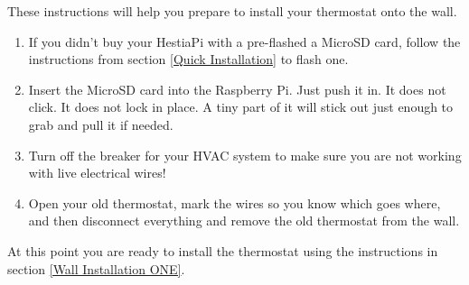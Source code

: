 These instructions will help you prepare to install your thermostat onto the
wall.

\begin{enumerate}
\item If you didn't buy your HestiaPi with a pre-flashed a MicroSD card, follow
      the instructions from section \ref{Quick Installation} to flash one.
\item Insert the MicroSD card into the Raspberry Pi. Just push it in. It
      does not click. It does not lock in place. A tiny part of it will stick
      out just enough to grab and pull it if needed.
\item Turn off the breaker for your HVAC system to make sure you are not
      working with live electrical wires!
\item Open your old thermostat, mark the wires so you know which goes where,
      and then disconnect everything and remove the old thermostat from the
      wall.
\end{enumerate}

At this point you are ready to install the thermostat using the instructions in
section \ref{Wall Installation ONE}.
